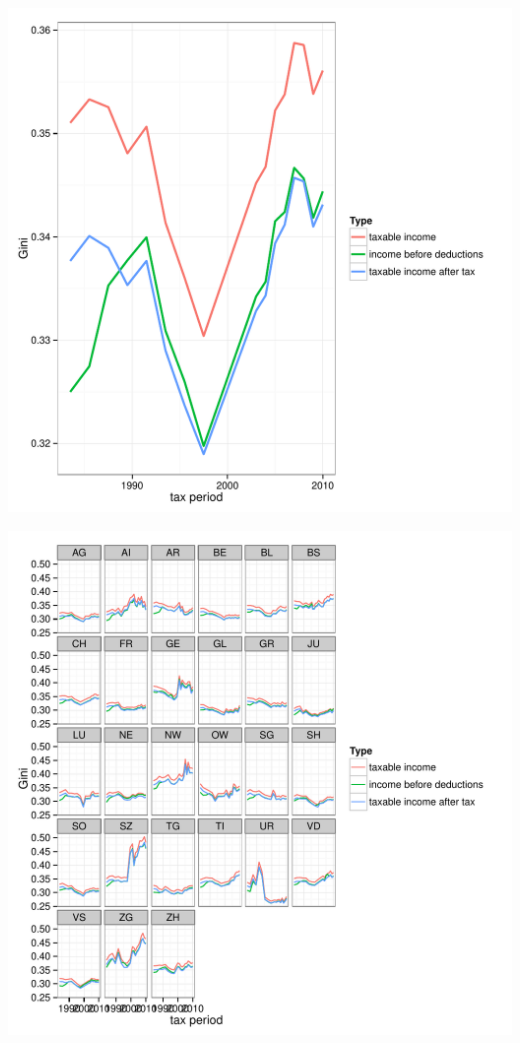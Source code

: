 \documentclass[twoside]{article}\usepackage[]{graphicx}\usepackage[]{color}
\makeatletter
\def\maxwidth{ %
  \ifdim\Gin@nat@width>\linewidth
    \linewidth
  \else
    \Gin@nat@width
  \fi
}
\newenvironment{knitrout}{}{} %
\makeatother
\begin{document}
\begin{multicols}{2}
\begin{knitrout}
\color{fgcolor}
\includegraphics[width=\maxwidth]{figure/different_ginis1} 

\includegraphics[width=\maxwidth]{figure/different_ginis2} 


\end{knitrout}
\end{multicols}
\end{document}

